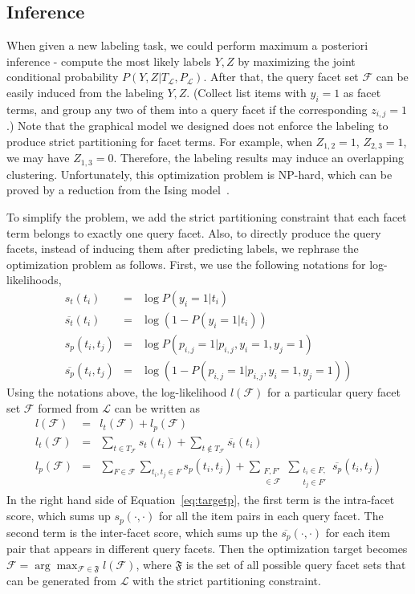 \subsection{Inference}
\label{sec:facet-infer}
When given a new labeling task, we could perform maximum a posteriori inference -
compute the most likely labels $Y, Z$ by maximizing the joint conditional probability $P(Y,Z|T_{\mathcal{L}},P_{\mathcal{L}})$.
After that, the query facet set $\mathcal{F}$ can be easily induced from the labeling $Y, Z$.
(Collect list items with $y_i=1$ as facet terms, and group any two of them into a query facet if the corresponding $z_{i,j}=1$.)
Note that the graphical model we designed does not enforce the labeling to produce strict partitioning for facet terms.
For example, when $Z_{1,2}=1$, $Z_{2,3}=1$, we may have $Z_{1,3}=0$.
Therefore, the labeling results may induce an overlapping clustering.
Unfortunately, this optimization problem is NP-hard, which can be proved by a reduction from the Ising model~\cite{barahona1982computational}.

To simplify the problem, we add the strict partitioning constraint that each facet term belongs to exactly one query facet.
Also, to directly produce the query facets, instead of inducing them after predicting labels, we rephrase the optimization problem as follows. First, we use the following notations for log-likelihoods,
\begin{eqnarray*}
 s_t(t_i) &=& \log P(y_i=1|t_i)      \nonumber \\
  \overline{s_t}(t_i)&=&\log \left( 1-P(y_i=1|t_i) \right) \nonumber \\
 s_p(t_i, t_j)&=&\log P(p_{i,j}=1|p_{i,j},y_i=1,y_j=1) \nonumber \\
  \overline{s_p}(t_i, t_j)&=&\log\left(1-P(p_{i,j}=1|p_{i,j},y_i=1,y_j=1)\right) \nonumber
\end{eqnarray*}
Using the notations above, the log-likelihood $l(\mathcal{F})$ for a particular query facet set $\mathcal{F}$ formed from $\mathcal{L}$ can be written as 
\begin{eqnarray}
\label{eq:target}
l(\mathcal{F}) &=&l_t(\mathcal{F}) + l_p(\mathcal{F}) \nonumber\\
l_t(\mathcal{F}) &=& \sum_{t\in T_\mathcal{F}}{s_t(t_i)}+\sum_{t\not\in T_\mathcal{F}}{\overline{s_t}(t_i)} \nonumber \\
l_p(\mathcal{F}) &=&\sum_{F \in \mathcal{F}}{\sum_{t_i,t_j \in F}{s_p(t_i,t_j)}} 
+ \sum_{\substack{F, F' \\ \in \mathcal{F}}}{\sum_{\substack{t_i \in F, \\ t_j \in F'}}{\overline{s_p}(t_i,t_j)}}
\label{eq:targetp}
\end{eqnarray}
In the right hand side of Equation~\ref{eq:targetp}, the first term  is the intra-facet score, which sums up $s_p(\cdot, \cdot)$ for all the item pairs in each query facet. The second term is the inter-facet score, which sums up the $\overline{s_p}(\cdot,\cdot)$ for each item pair that appears in different query facets. Then the optimization target becomes $\mathcal{F}=\arg\max_{\mathcal{F}\in\mathfrak{F}}{l(\mathcal{F})}$, where $\mathfrak{F}$ is the set of all possible query facet sets that can be generated from $\mathcal{L}$ with the strict partitioning constraint.

